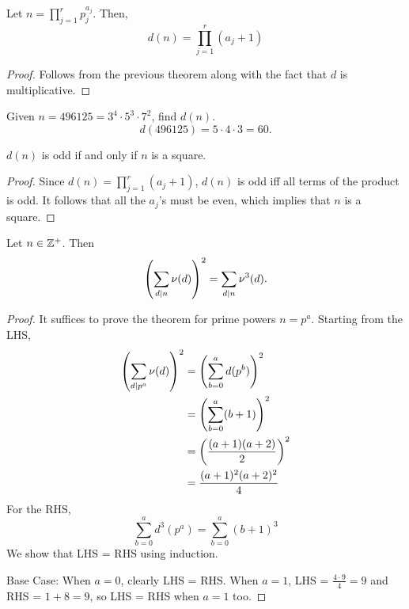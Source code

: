 \begin{theorem}
    Let $n = \prod_{j=1}^r p_j^{a_j}$. Then,
    $$
    d(n) = \prod_{j=1}^r (a_j + 1)
    $$
\end{theorem}
\begin{proof}
    Follows from the previous theorem along with the fact that $d$ is multiplicative.
\end{proof}

\begin{example}
    Given $n = 496125 = 3^4 \cdot 5^3 \cdot 7^2$, find $d(n)$.
    $$
    d(496125) = 5 \cdot 4 \cdot 3 = 60.
    $$ 
\end{example}

\begin{theorem}
    $d(n)$ is odd if and only if $n$ is a square.
\end{theorem}
\begin{proof}
    Since $d(n) = \prod_{j=1}^r (a_j + 1)$, $d(n)$ is odd iff all terms of the product is odd. It follows that all the $a_j$'s must be even, which implies that $n$ is a square.
\end{proof}

\begin{theorem}
    Let $n \in \mathbb{Z}^+$. Then
    $$
    \left( \sum_{d \mathrel{\mid} n} \nu(d) \right)^2 = \sum_{d \mathrel{\mid} n} \nu^3(d).
    $$
\end{theorem}

\begin{proof}
    It suffices to prove the theorem for prime powers $n = p^a$. Starting from the LHS,
    $$
    \begin{aligned}
        \left( \sum_{d \mathrel{\mid} p^a} \nu(d) \right)^2 &= \left( \sum_{b=0}^a d(p^b) \right)^2 \\
        &= \left( \sum_{b=0}^a (b+1) \right)^2 \\
        &= \left( \frac{(a+1)(a+2)}{2} \right)^2 \\
        &= \frac{(a+1)^2(a+2)^2}{4}
    \end{aligned}
    $$
    For the RHS,
    $$
    \sum_{b=0}^a d^3(p^a) = \sum_{b=0}^a (b+1)^3
    $$
    We show that LHS = RHS using induction.

    Base Case: When $a = 0$, clearly LHS = RHS. When $a = 1$, LHS = $\frac{4 \cdot 9}{4} = 9$ and RHS = $1 + 8 = 9$, so LHS = RHS when $a = 1$ too.
\end{proof}